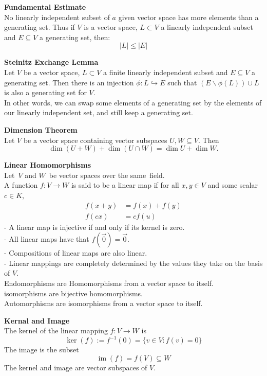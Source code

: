 \documentclass[a4paper, 10pt]{article}
\begin{document}
\begin{multicols*}{3}
\textbf{Fundamental Estimate}\\
No linearly independent subset of $a$ given vector space has more elements than a generating set. Thus if $V$ is a vector space, $L \subset V$ a linearly independent subset and $E \subseteq V$ a generating set, then:
$$
|L| \leqslant|E|
$$

\textbf{Steinitz Exchange Lemma}\\
Let $V$ be a vector space, $L \subset V$ a finite linearly independent subset and $E \subseteq V$ a generating set. Then there is an injection $\phi: L \hookrightarrow E$ such that $(E \backslash \phi(L)) \cup L$ is also a generating set for $V$.\\
In other words, we can swap some elements of a generating set by the elements of our linearly independent set, and still keep a generating set.

\textbf{Dimension Theorem}\\
Let $V$ be a vector space containing vector subspaces $U, W \subseteq V$. Then
$$
\operatorname{dim}(U+W)+\operatorname{dim}(U \cap W)=\operatorname{dim} U+\operatorname{dim} W .
$$

\textbf{Linear Homomorphisms}\\
Let $V$ and $W$ be vector spaces over the same field. \\
A function $f:V\rightarrow W$ is said to be a linear map if for all $x,y\in V$ and some scalar $c\in K$,
\begin{align*}
f(x+y) &= f(x)+f(y)\\
f(cx) &= cf(u)
\end{align*}
- A linear map is injective if and only if its kernel is zero. \\
- All linear maps have that $f(\vec{0})=\vec{0}$.\\
- Compositions of linear maps are also linear.\\
- Linear mappings are completely determined by the values they take on the basis of $V$. \\
Endomorphisms are Homomorphisms from a vector space to itself.\\
isomorphisms are bijective homomorphisms.\\
Automorphisms are isomorphisms from a vector space to itself.

\textbf{Kernal and Image}\\
The kernel of the linear mapping $f:V\rightarrow W$ is
$$
\operatorname{ker}(f):=f^{-1}(0)=\{v \in V: f(v)=0\}
$$
The image is the subset $$\operatorname{im}(f)=f(V) \subseteq W$$ 
The kernel and image are vector subspaces of $V$.


\end{multicols*}
\end{document}
